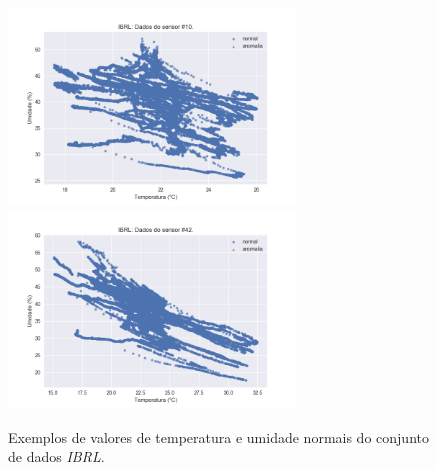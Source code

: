 \documentclass[cic,tc]{iiufrgs}
\begin{document}
\begin{figure}
\begin{adjustwidth}{-1in}{-.8in}
\includegraphics[width=0.68\textwidth]{IBRL_10.png}
\includegraphics[width=0.68\textwidth]{IBRL_42.png}
\caption{Exemplos de valores de temperatura e umidade normais do conjunto de dados \textit{IBRL}.}
\label{ibrl_normais}
\end{adjustwidth}
\end{figure}
\end{document}
